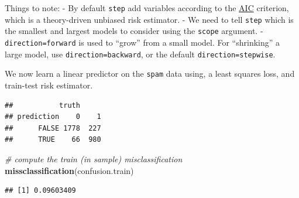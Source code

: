\documentclass[]{book}
\newenvironment{Shaded}{\begin{snugshade}}{\end{snugshade}}
\newcommand{\KeywordTok}[1]{\textcolor[rgb]{0.13,0.29,0.53}{\textbf{#1}}}
\newcommand{\DataTypeTok}[1]{\textcolor[rgb]{0.13,0.29,0.53}{#1}}
\newcommand{\DecValTok}[1]{\textcolor[rgb]{0.00,0.00,0.81}{#1}}
\newcommand{\FloatTok}[1]{\textcolor[rgb]{0.00,0.00,0.81}{#1}}
\newcommand{\StringTok}[1]{\textcolor[rgb]{0.31,0.60,0.02}{#1}}
\newcommand{\CommentTok}[1]{\textcolor[rgb]{0.56,0.35,0.01}{\textit{#1}}}
\newcommand{\OperatorTok}[1]{\textcolor[rgb]{0.81,0.36,0.00}{\textbf{#1}}}
\newcommand{\NormalTok}[1]{#1}
\theoremstyle{definition}
\theoremstyle{definition}
\theoremstyle{definition}
\theoremstyle{remark}
\begin{document}
Things to note: - By default \texttt{step} add variables according to
the
\href{https://en.wikipedia.org/wiki/Akaike_information_criterion}{AIC}
criterion, which is a theory-driven unbiased risk estimator. - We need
to tell \texttt{step} which is the smallest and largest models to
consider using the \texttt{scope} argument. - \texttt{direction=forward}
is used to ``grow'' from a small model. For ``shrinking'' a large model,
use \texttt{direction=backward}, or the default
\texttt{direction=stepwise}.

We now learn a linear predictor on the \texttt{spam} data using, a least
squares loss, and train-test risk estimator.

\begin{Shaded}
\end{Shaded}

\begin{verbatim}
##           truth
## prediction    0    1
##      FALSE 1778  227
##      TRUE    66  980
\end{verbatim}

\begin{Shaded}
\begin{Highlighting}[]
\CommentTok{# compute the train (in sample) misclassification}
\KeywordTok{missclassification}\NormalTok{(confusion.train) }
\end{Highlighting}
\end{Shaded}

\begin{verbatim}
## [1] 0.09603409
\end{verbatim}

\begin{Shaded}
\end{Shaded}
\end{document}
